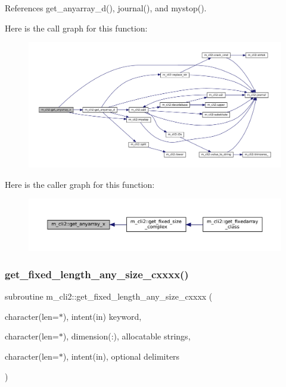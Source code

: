 References get\+\_\+anyarray\+\_\+d(), journal(), and mystop().

Here is the call graph for this function\+:
\nopagebreak
\begin{figure}[H]
\begin{center}
\leavevmode
\includegraphics[width=350pt]{namespacem__cli2_ab9ab288fa5f108beeb7c94d81b223b7c_cgraph}
\end{center}
\end{figure}
Here is the caller graph for this function\+:\nopagebreak
\begin{figure}[H]
\begin{center}
\leavevmode
\includegraphics[width=350pt]{namespacem__cli2_ab9ab288fa5f108beeb7c94d81b223b7c_icgraph}
\end{center}
\end{figure}
\mbox{\label{namespacem__cli2_abc31389c45dcd95b8db641b59b98b447}} 
\subsubsection{\texorpdfstring{get\+\_\+fixed\+\_\+length\+\_\+any\+\_\+size\+\_\+cxxxx()}{get\_fixed\_length\_any\_size\_cxxxx()}}
{\footnotesize\ttfamily subroutine m\+\_\+cli2\+::get\+\_\+fixed\+\_\+length\+\_\+any\+\_\+size\+\_\+cxxxx (\begin{DoxyParamCaption}\item[{character(len=$\ast$), intent(in)}]{keyword,  }\item[{character(len=$\ast$), dimension(\+:), allocatable}]{strings,  }\item[{character(len=$\ast$), intent(in), optional}]{delimiters }\end{DoxyParamCaption})\hspace{0.3cm}{\ttfamily [private]}}



